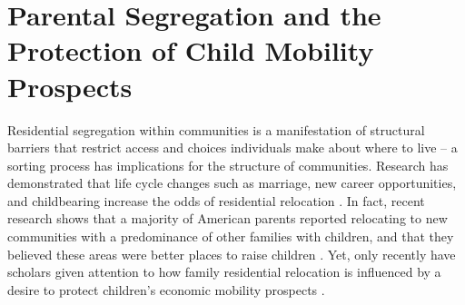 

\section{Parental Segregation and the Protection of Child Mobility Prospects}



Residential segregation within communities is a manifestation of structural barriers that restrict access and choices individuals make about where to live -- a sorting process has implications for the structure of communities. Research has demonstrated that life cycle changes such as marriage, new career opportunities, and childbearing increase the odds of residential relocation \citep{clark_et_al_1994,rossi_and_shlay_1982,rossi_1980,davanzo_1976,clark_and_davies-withers_1999,dieleman_et_al_1995}. In fact, recent research shows that a majority of American parents reported relocating to new communities with a predominance of other families with children, and that they believed these areas were better places to raise children \citep{taylor_et_al_2008,clark_and_davies-withers_1999,rossi_and_shlay_1982}. Yet, only recently have scholars given attention to how family residential relocation is influenced by a desire to protect children's economic mobility prospects \citep{owens_2016,beisel_1997}. 

